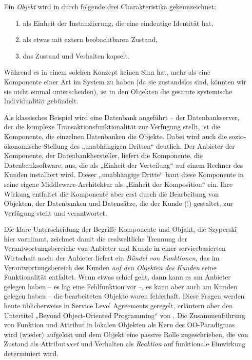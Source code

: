 \documentclass[11pt,a4paper]{article}
\begin{document}
Ein \emph{Objekt} wird in \cite{Szyperski2002} durch folgende drei
Charakteristika gekennzeichnet:
\begin{itemize}
\item [1.] als Einheit der Instanziierung, die eine eindeutige Identität hat, 
\item [2.] als etwas mit extern beobachtbaren Zustand,
\item [3.] das Zustand und Verhalten kapselt.
\end{itemize}
Während es in einem solchen Konzept keinen Sinn hat, mehr als eine Komponente
einer Art im System zu haben (da sie zustandslos sind, könnten wir sie nicht
einmal unterscheiden), ist in den Objekten die gesamte systemische
Individualität gebündelt.

Als klassisches Beispiel wird eine Datenbank angeführt -- der Datenbankserver,
der die komplexe Transaktionsfunktionalität zur Verfügung stellt, ist die
Komponente, die einzelnen Datenbanken die Objekte.  Dabei wird auch die
sozio-ökonomische Stellung des „unabhängigen Dritten“ deutlich. Der Anbieter
der Komponente, der Datenbankhersteller, liefert die Komponente, die
Datenbanksoftware, aus, die als „Einheit der Verteilung“ auf einem Rechner des
Kunden installiert wird. Dieser „unabhängige Dritte“ baut diese Komponente in
seine eigene Middleware-Architektur als „Einheit der Komposition“ ein.  Ihre
Wirkung entfaltet die Komponente aber erst durch die Bearbeitung von Objekten,
der Datenbanken und Datensätze, die der Kunde (!) gestaltet, zur Verfügung
stellt und verantwortet.

Die klare Unterscheidung der Begriffe Komponente und Objakt, die Szyperski
hier vornimmt, zeichnet damit die realweltliche Trennung der
Verantwortungsbereiche von Anbieter und Kunde in einer servicebasierten
Wirtschaft nach: der Anbieter liefert ein \emph{Bündel von Funktionen}, das im
Verantwortungsbereich des Kunden \emph{auf den Objekten des Kunden} seine
Funktionalität entfaltet. Wenn etwas schief geht, dann kann es am Anbieter
gelegen haben -- es lag eine Fehlfunktion vor --, es kann aber auch am Kunden
gelegen haben -- die bearbeiteten Objekte waren fehlerhaft. Diese Fragen
werden heute üblicherweise in Service Level Agreements geregelt, erläutern
aber den Untertitel „Beyond Object-Oriented Programming“ von
\cite{Szyperski2002}.  Die Zusammenführung von Funktion und Attribut in
lokalen Objekten als Kern des OO-Paradigmas wird (wieder) aufgelöst und dem
Objekt eine passive Rolle zugeschrieben, die von Zustand als
Attribut\emph{wert} und Verhalten als \emph{Reaktion} auf funktionale
Einwirkung determiniert wird.
\end{document}
